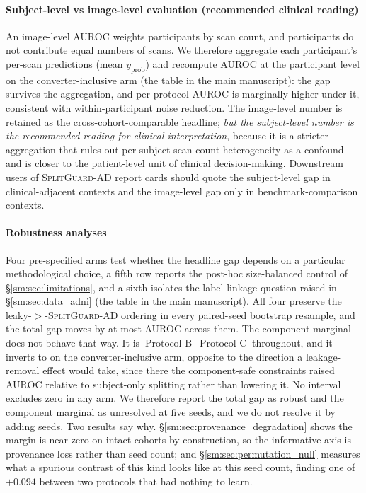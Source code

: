 \documentclass[11pt]{article}
\newcommand{\SGA}{\textsc{SplitGuard-AD}}
\begin{document}
\paragraph{Subject-level vs image-level evaluation (recommended
clinical reading)}
An image-level AUROC weights participants by scan count, and
participants do not contribute equal numbers of scans. We therefore
aggregate each participant's per-scan predictions (mean
$y_\text{prob}$) and recompute AUROC at the participant level on the
converter-inclusive arm (the table in the main manuscript): the gap
survives the aggregation, and per-protocol AUROC is marginally higher
under it, consistent with within-participant noise reduction. The
image-level number is retained as the cross-cohort-comparable
headline; \emph{but
the subject-level number is the recommended reading for clinical
interpretation}, because it is a stricter aggregation that rules out
per-subject scan-count heterogeneity as a confound and is closer to
the patient-level unit of clinical decision-making. Downstream users
of \SGA{} report cards should quote the subject-level gap in
clinical-adjacent contexts and the image-level gap only in
benchmark-comparison contexts.



\paragraph{Robustness analyses}
Four pre-specified arms test whether the headline gap depends on a
particular methodological choice, a fifth row reports the post-hoc
size-balanced control of \S\ref{sm:sec:limitations}, and a sixth isolates
the label-linkage question raised in \S\ref{sm:sec:data_adni}
(the table in the main manuscript). All four preserve the
leaky-$>$-\SGA{} ordering in every paired-seed bootstrap resample, and
the total gap moves by at most \AdniArmSpread{} AUROC across them. The
component marginal does not behave that way. It is
$\text{Protocol B} - \text{Protocol C}$ throughout, and it inverts to
\AdniConvMarginal{} on the converter-inclusive arm, opposite to the
direction a leakage-removal effect would take, since there the
component-safe constraints raised AUROC relative to subject-only
splitting rather than lowering it. No interval excludes zero in any arm. We therefore
report the total gap as robust and the component marginal as
unresolved at five seeds, and we do not resolve it by adding seeds.
Two results say why. \S\ref{sm:sec:provenance_degradation} shows the
margin is near-zero on intact cohorts by construction, so the
informative axis is provenance loss rather than seed count; and
\S\ref{sm:sec:permutation_null} measures what a spurious contrast of this
kind looks like at this seed count, finding one of $+0.094$ between two
protocols that had nothing to learn.
\end{document}
